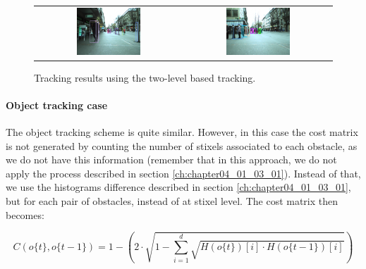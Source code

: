 \begin{figure}[h!]
    \centering
    \begin{tabular}{ cc }
      \includegraphics[width=0.45\textwidth]{sequenceTwoLevel/twolevel30}\label{fig:cp04_two_level_example_15} &
      \includegraphics[width=0.45\textwidth]{sequenceTwoLevel/twolevel320}\label{fig:cp04_two_level_example_126}
    \end{tabular}
  \caption{Tracking results using the two-level based tracking.}\label{fig:cp04_tracking_examples_two_level}
\end{figure}

\paragraph{Object tracking case}\label{ch:chapter04_01_04_02_02}

The object tracking scheme is quite similar. However, in this case the cost matrix is not generated by counting the number of stixels associated to each obstacle, as we do not have this information (remember that in this approach, we do not apply the process described in section \ref{ch:chapter04_01_03_01}). Instead of that, we use the histograms difference described in section \ref{ch:chapter04_01_03_01}, but for each pair of obstacles, instead of at stixel level. The cost matrix then becomes:

\begin{equation}\label{eq:cp04_object_matching_histograms_cost}
C(o\{t\}, o\{t - 1\}) = 1 - \left ( 2 \cdot \sqrt { 1 - \underset{i=1}{\overset{d}{\sum}}\sqrt{H(o\{t\})[i] \cdot H(o\{t - 1\})[i]}} \right )
\end{equation}

